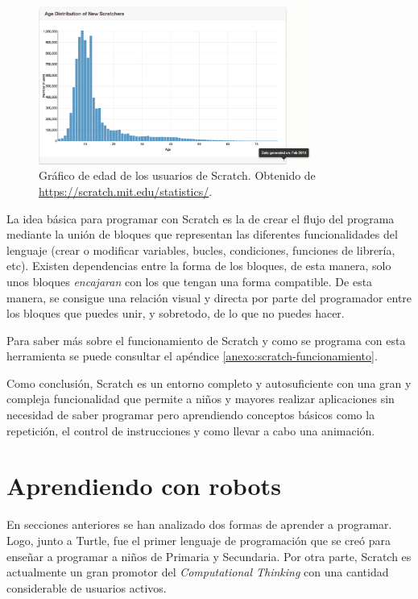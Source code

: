 \begin{figure}[!ht]
	\begin{centering}
		\includegraphics[width=0.8\textwidth]{images/scratch-edad.png}
			\caption{Gráfico de edad de los usuarios de Scratch. Obtenido de \url{https://scratch.mit.edu/statistics/}.}
				\label{fig:scratch-edad}
	\end{centering}
\end{figure}


La idea básica para programar con Scratch es la de crear el flujo del programa mediante la unión de bloques que representan las diferentes funcionalidades del lenguaje (crear o modificar variables, bucles, condiciones, funciones de librería, etc). Existen dependencias entre la forma de los bloques, de esta manera, solo unos bloques \emph{encajaran} con los que tengan una forma compatible. De esta manera, se consigue una relación visual y directa por parte del programador entre los bloques que puedes unir, y sobretodo, de lo que no puedes hacer.

Para saber más sobre el funcionamiento de Scratch y como se programa con esta herramienta se puede consultar el apéndice \ref{anexo:scratch-funcionamiento}.

Como conclusión, Scratch es un entorno completo y autosuficiente con una gran y compleja funcionalidad que permite a niños y mayores realizar aplicaciones sin necesidad de saber programar pero aprendiendo conceptos básicos como la repetición, el control de instrucciones y como llevar a cabo una animación. 



\section{Aprendiendo con robots}
\label{sec:aprendiendo-robots}


En secciones anteriores se han analizado dos formas de aprender a programar. Logo, junto a Turtle, fue el primer lenguaje de programación que se creó para enseñar a programar a niños de Primaria y Secundaria. Por otra parte, Scratch es actualmente un gran promotor del \emph{Computational Thinking} con una cantidad considerable de usuarios activos.

